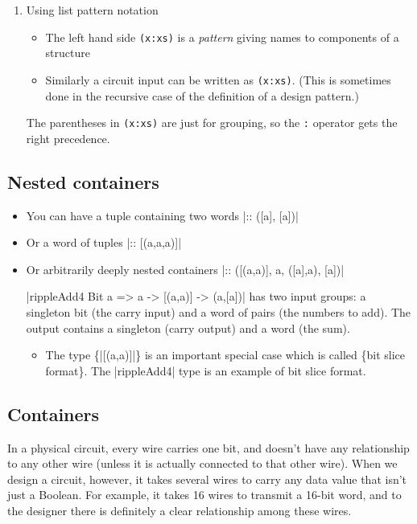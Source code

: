 \documentclass[11pt]{article}
\begin{document}
\begin{enumerate}
\item Using list pattern notation
\label{sec:org8dd7ad5}

\begin{itemize}
\item The left hand side \texttt{(x:xs)} is a \emph{pattern} giving
names to components of a structure
\item Similarly a circuit input can be written as \texttt{(x:xs)}.
(This is sometimes done in the recursive case of the definition
of a design pattern.)
\end{itemize}

The parentheses in \texttt{(x:xs)} are just for grouping, so the
\texttt{:} operator gets the right precedence.
\end{enumerate}

\subsection{Nested containers}
\label{sec:org7bd4ea7}

\begin{itemize}
\item You can have a tuple containing two words |:: ([a], [a])|
\item Or a word of tuples |:: [(a,a,a)]|
\item Or arbitrarily deeply nested containers |:: ([(a,a)], a, ([a],a),
[a])|
\item[{|rippleAdd4}] Bit a => a -> [(a,a)] -> (a,[a])| has two input
groups: a singleton bit (the carry input) and a word of pairs (the
numbers to add).  The output contains a singleton (carry output) and
a word (the sum).
\begin{itemize}
\item The type \{\color{red}|[(a,a)]|\} is an important special case
which is called \{\color{blue}bit slice format\}.  The |rippleAdd4|
type is an example of bit slice format.
\end{itemize}
\end{itemize}

\subsection{Containers}
\label{sec:org69b11c4}

In a physical circuit, every wire carries one bit, and doesn't have
any relationship to any other wire (unless it is actually connected to
that other wire).  When we design a circuit, however, it takes several
wires to carry any data value that isn't just a Boolean.  For example,
it takes 16 wires to transmit a 16-bit word, and to the designer there
is definitely a clear relationship among these wires.
\end{document}
